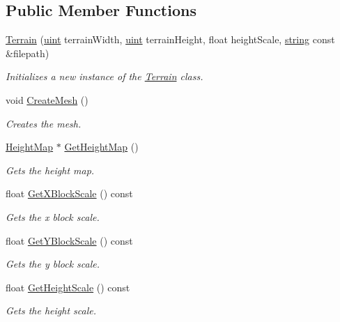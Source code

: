 \subsection*{Public Member Functions}
\begin{DoxyCompactItemize}
\item 
\hyperlink{class_terrain_a50392203c65b6d8d0b2b243effc07053}{Terrain} (\hyperlink{_types_8h_a4f5fce8c1ef282264f9214809524d836}{uint} terrain\+Width, \hyperlink{_types_8h_a4f5fce8c1ef282264f9214809524d836}{uint} terrain\+Height, float height\+Scale, \hyperlink{_types_8h_ad453f9f71ce1f9153fb748d6bb25e454}{string} const \&filepath)
\begin{DoxyCompactList}\small\item\em Initializes a new instance of the \hyperlink{class_terrain}{Terrain} class. \end{DoxyCompactList}\item 
void \hyperlink{class_terrain_ae7bafb8ba2f656805c07fbef600a35c4}{Create\+Mesh} ()
\begin{DoxyCompactList}\small\item\em Creates the mesh. \end{DoxyCompactList}\item 
\hyperlink{class_height_map}{Height\+Map} $\ast$ \hyperlink{class_terrain_a7572ad49b7cb4afa13985ee6a03b8f3b}{Get\+Height\+Map} ()
\begin{DoxyCompactList}\small\item\em Gets the height map. \end{DoxyCompactList}\item 
float \hyperlink{class_terrain_ac84a3495e2f0f8246bf1beb2c2729969}{Get\+X\+Block\+Scale} () const 
\begin{DoxyCompactList}\small\item\em Gets the x block scale. \end{DoxyCompactList}\item 
float \hyperlink{class_terrain_a516ec45b81582973a7620eae202425d8}{Get\+Y\+Block\+Scale} () const 
\begin{DoxyCompactList}\small\item\em Gets the y block scale. \end{DoxyCompactList}\item 
float \hyperlink{class_terrain_aa1794b225571f41c330ff3b88fa3d48b}{Get\+Height\+Scale} () const 
\begin{DoxyCompactList}\small\item\em Gets the height scale. \end{DoxyCompactList}\item 

\end{DoxyCompactItemize}
